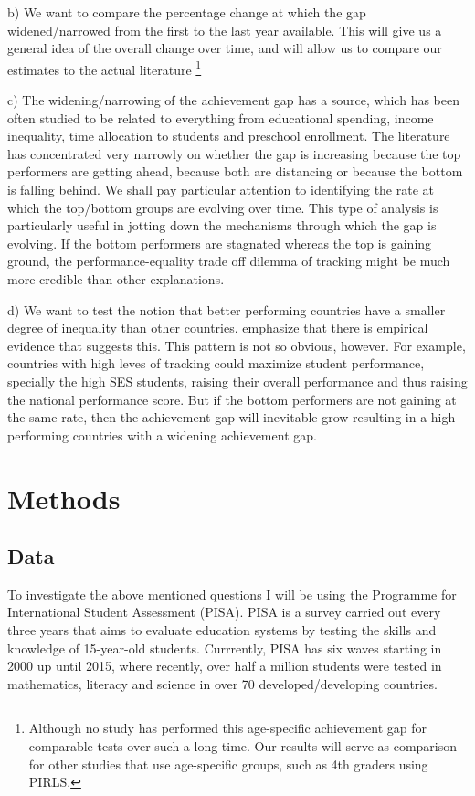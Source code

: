\documentclass[11pt, a4paper]{article}\usepackage[]{graphicx}\usepackage[]{color}
\begin{document}
b) We want to compare the percentage change at which the gap widened/narrowed from the first to the last year available. This will give us a general idea of the overall change over time, and will allow us to compare our estimates to the actual literature \footnote{Although no study has performed this age-specific achievement gap for comparable tests over such a long time. Our results will serve as comparison for other studies that use age-specific groups, such as 4th graders using PIRLS.}

c) The widening/narrowing of the achievement gap has a source, which has been often studied to be related to everything from educational spending, income inequality, time allocation to students and preschool enrollment. The literature has concentrated very narrowly on whether the gap is increasing because the top performers are getting ahead, because both are distancing or because the bottom is falling behind. We shall pay particular attention to identifying the rate at which the top/bottom groups are evolving over time. This type of analysis is particularly useful in jotting down the mechanisms through which the gap is evolving. If the bottom performers are stagnated whereas the top is gaining ground, the performance-equality trade off dilemma of tracking might be much more credible than other explanations.

d) We want to test the notion that better performing countries have a smaller degree of inequality than other countries. \citet{werfhorst_mijs} emphasize that there is empirical evidence that suggests this. This pattern is not so obvious, however. For example, countries with high leves of tracking could maximize student performance, specially the high SES students, raising their overall performance and thus raising the national performance score. But if the bottom performers are not gaining at the same rate, then the achievement gap will inevitable grow resulting in a high performing countries with a widening achievement gap.

\section{Methods}

\subsection{Data}



To investigate the above mentioned questions I will be using the Programme for International Student Assessment (PISA). PISA is a survey carried out every three years that aims to evaluate education systems by testing the skills and knowledge of 15-year-old students. Currrently, PISA has six waves starting in 2000 up until 2015, where recently, over half a million students were tested in mathematics, literacy and science in over 70 developed/developing countries.
\end{document}
